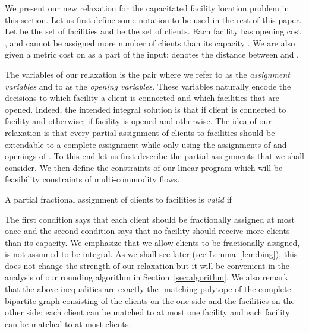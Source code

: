 We present our new relaxation for the capacitated facility location problem in this section. Let us first define some notation to be used in the rest of this paper. Let  be the set of facilities and  be the set of clients. Each facility  has opening cost , and cannot be assigned more number of clients than its capacity . We are also given a metric cost  on  as a part of the input:  denotes the distance between  and .

The variables of our relaxation is the pair  where we refer to  as the \emph{assignment variables} and to  as the \emph{opening variables}. These variables naturally encode the decisions to which facility a client is connected
and which facilities that are opened. Indeed, the intended integral solution is that  if
client  is connected to facility  and  otherwise;  if facility  is
opened and  otherwise. The idea of our relaxation is that every partial assignment of
clients to facilities should be extendable to a complete assignment while only using the assignments
of  and openings of . To this end let us first describe the partial assignments
that we shall consider. We then define the constraints of our linear program which will be
feasibility constraints of multi-commodity flows.

A partial fractional assignment  of clients to facilities is  \emph{valid} if

The first condition says that each client should be fractionally assigned at most once and the
second condition says that no facility should receive more clients than its capacity. We emphasize
that we allow clients to be fractionally assigned, \ie  is not assumed to  be integral. As we
shall see later (see Lemma~\ref{lem:bing}), this does not change the strength of our relaxation but it will
be convenient in the analysis of our rounding algorithm in Section~\ref{sec:algorithm}. We also remark that
the above inequalities are exactly the -matching polytope of the complete bipartite graph
consisting of the clients on the one side and the facilities on the other side; each client can be
matched to at most one facility and each facility  can be matched to at most  clients.


